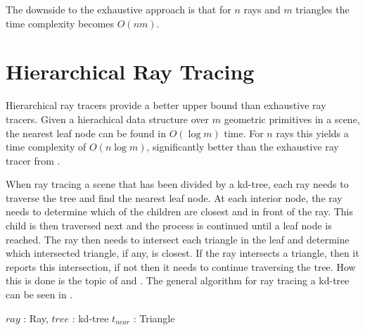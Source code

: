 The downside to the exhaustive approach is that for $n$ rays and $m$
triangles the time complexity becomes $O(nm)$.

\section{Hierarchical Ray Tracing}\label{sec:hierarchicalTraversal}


Hierarchical ray tracers provide a better upper bound than exhaustive ray
tracers. Given a hierachical data structure over $m$ geometric primitives in a
scene, the nearest leaf node can be found in $O(\log m)$ time. For $n$ rays
this yields a time complexity of $O(n \log m)$, significantly better than the
exhaustive ray tracer from .


When ray tracing a scene that has been divided by a kd-tree, each ray needs to
traverse the tree and find the nearest leaf node. At each interior node, the ray
needs to determine which of the children are closest and in front of the
ray. This child is then traversed next and the process is continued until a leaf
node is reached. The ray then needs to intersect each triangle in the leaf and
determine which intersected triangle, if any, is closest. If the ray intersects
a triangle, then it reports this intersection, if not then it needs to continue
traversing the tree. How this is done is the topic of 
and . The general algorithm for ray tracing a kd-tree
can be seen in .

\begin{algorithm}
  \caption{A general kd-tree traversal algorithm for ray tracing}
  \label{alg:generalTracing}
  \begin{algorithmic}
              {$ray$ : Ray, $tree$ : kd-tree}
              {$t_{near}$ : Triangle}{
                  \ELSE
                  \ENDIF
                \ENDWHILE
              }
  \end{algorithmic}
\end{algorithm}

